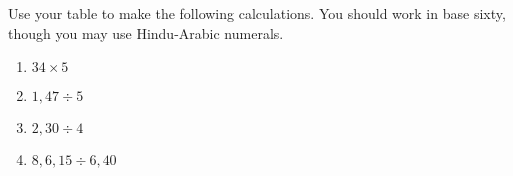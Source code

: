\documentclass[nooutcomes]{ximera}
\begin{document}
%

\begin{problem}
Use your table to make the following calculations.  You should work in base sixty, though you may use Hindu-Arabic numerals.
\begin{enumerate}
    \item $34 \times 5$
    \item $1,47 \div 5$
    \item $2,30 \div 4$
    \item $8,6,15 \div 6,40$
\end{enumerate}
\end{problem}
\end{document}
